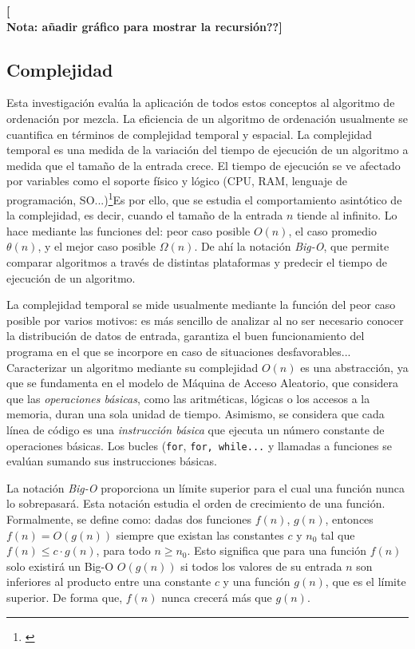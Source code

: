 \documentclass[titlepage]{article}
\begin{document}
\textbf{[\\Nota: añadir gráfico para mostrar la recursión??]}

\subsection{Complejidad}
Esta investigación evalúa la aplicación de todos estos conceptos al algoritmo de ordenación por mezcla. La eficiencia de un algoritmo de ordenación usualmente se cuantifica en términos de complejidad temporal y espacial. La complejidad temporal es una medida de la variación del tiempo de ejecución de un algoritmo a medida que el tamaño de la entrada crece. El tiempo de ejecución se ve afectado por variables como el soporte físico y lógico (CPU, RAM, lenguaje de programación, SO...)\footnote{\cite{Heineman2008-mw}}Es por ello, que se estudia el comportamiento asintótico de la complejidad, es decir, cuando el tamaño de la entrada $n$ tiende al infinito. Lo hace mediante las funciones del: peor caso posible \(O(n)\), el caso promedio \(\theta(n)\), y el mejor caso posible \(\Omega(n)\). \footnotemark[8] De ahí la notación \textit{Big-O}, que permite comparar algoritmos a través de distintas plataformas y predecir el tiempo de ejecución de un algoritmo.

La complejidad temporal se mide usualmente mediante la función del peor caso posible por varios motivos: es más sencillo de analizar al no ser necesario conocer la distribución de datos de entrada, garantiza el buen funcionamiento del programa en el que se incorpore en caso de situaciones desfavorables... Caracterizar un algoritmo mediante su complejidad \(O(n)\) es una abstracción, ya que se fundamenta en el modelo de Máquina de Acceso Aleatorio, que considera que las \textit{operaciones básicas}, como las aritméticas, lógicas o los accesos a la memoria, duran una sola unidad de tiempo. Asimismo, se considera que cada línea de código es una \textit{instrucción básica} que ejecuta un número constante de operaciones básicas. Los bucles (\lstinline{for}, \lstinline{for, while...} y llamadas a funciones se evalúan sumando sus instrucciones básicas.

La notación \textit{Big-O} proporciona un límite superior para el cual una función nunca lo sobrepasará. Esta notación estudia el orden de crecimiento de una función. Formalmente, se define como: dadas dos funciones \(f(n)\), \(g(n)\), entonces \(f(n) = O(g(n))\) siempre que existan las constantes \(c\) y \(n_0\) tal que \(f(n) \leq c\cdot g(n)\), para todo \(n \geq n_0\). Esto significa que para una función \(f(n)\) solo existirá un Big-O \(O(g(n))\) si todos los valores de su entrada \(n\) son inferiores al producto entre una constante \(c\) y una función \(g(n)\), que es el límite superior. De forma que, \(f(n)\) nunca crecerá más que \(g(n)\).
\end{document}
